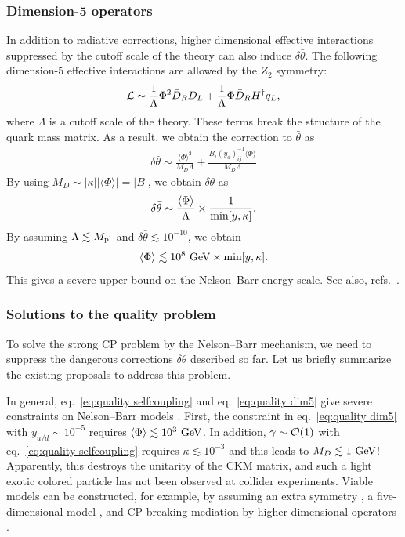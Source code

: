 \documentclass[11pt,a4paper]{article}
\begin{document}
\subsubsection*{Dimension-5 operators}
In addition to radiative corrections, higher dimensional effective interactions suppressed by the cutoff scale of the theory can also induce $\delta\bar\theta$.
The following dimension-5 effective interactions are allowed by the $Z_2$ symmetry:
\begin{align}
    {\cal L} \sim \frac{1}{\Lambda} \Phi^2 \bar D_R D_L + \frac{1}{\Lambda} \Phi \bar D_R H^\dagger q_L, \label{eq:dim5 op}
\end{align}
where $\Lambda$ is a cutoff scale of the theory.
These terms break the structure of the quark mass matrix.
As a result, we obtain the correction to $\bar\theta$ as \cite{Asadi:2022vys}
\begin{align}
    \delta\bar\theta \sim \frac{\langle \Phi \rangle^2}{M_D \Lambda} + \frac{B_{i} (y_d)^{-1}_{ij}  \langle \Phi \rangle}{M_D \Lambda}
\end{align}
By using $M_D \sim |\kappa| |\langle\Phi\rangle| = |B|$, we obtain $\delta\bar\theta$ as \begin{align}
    \delta\bar\theta \sim \frac{\langle \Phi\rangle}{\Lambda}  \times \frac{1}{{\rm min}[y,\kappa]}.
\end{align}
By assuming $\Lambda \lesssim M_{\rm pl}$ and $\delta\bar\theta \lesssim 10^{-10}$, we obtain \begin{align}
    \langle \Phi \rangle \lesssim 10^8~{\rm GeV} \times {\rm min}[y,\kappa]. \label{eq:quality dim5}
\end{align}
This gives a severe upper bound on the Nelson--Barr energy scale. See also, refs.~\cite{Dine:2015jga, Perez:2020dbw}.

\subsubsection*{Solutions to the quality problem}
To solve the strong CP problem by the Nelson--Barr mechanism, we need to suppress the dangerous corrections $\delta\bar\theta$ described so far. Let us briefly summarize the existing proposals to address this problem.

In general, eq.~\eqref{eq:quality selfcoupling} and eq.~\eqref{eq:quality dim5} give severe constraints on Nelson--Barr models \cite{Perez:2020dbw, Asadi:2022vys}.
First, the constraint in eq.~\eqref{eq:quality dim5} with $y_{u/d} \sim 10^{-5}$ requires $\langle \Phi \rangle \lesssim 10^3~{\rm GeV}$.
In addition, $\gamma \sim {\cal O}(1)$ with eq.~\eqref{eq:quality selfcoupling} requires $\kappa \lesssim 10^{-3}$ and this leads to $M_D \lesssim 1~{\rm GeV}$! Apparently, this destroys the unitarity of the CKM matrix, and such a light exotic colored particle has not been observed at collider experiments.
Viable models can be constructed, for example, by assuming an extra symmetry \cite{Perez:2020dbw, Asadi:2022vys, Perez:2023zin, Murai:2024alz}, a five-dimensional model \cite{Girmohanta:2022giy},
and CP breaking mediation by higher dimensional operators \cite{Valenti:2021xjp, Csaki:2025ikr}.
\end{document}
